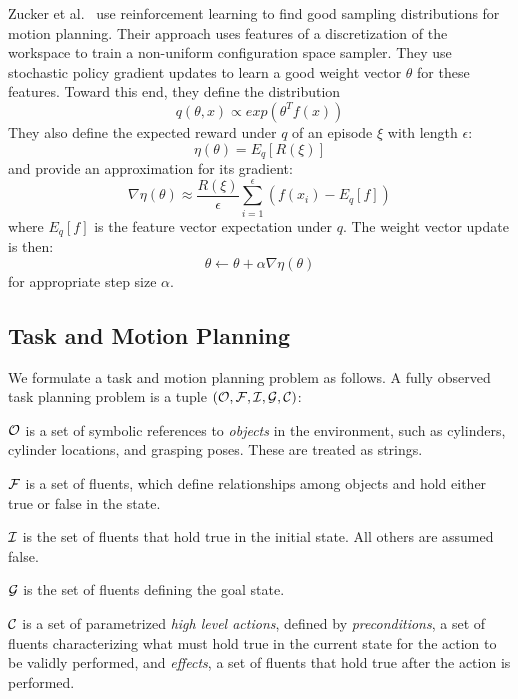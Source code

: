Zucker et al.~\cite{workspacebias} use reinforcement learning to find good sampling distributions
for motion planning. Their approach uses features of a discretization of the workspace to train
a non-uniform configuration space sampler. They use stochastic policy gradient updates to learn a good weight
vector $\theta$ for these features. Toward this end, they define the distribution
\begin{equation}
q(\theta, x) \propto exp(\theta^{T} f(x))
\end{equation}
They also define the expected reward under $q$ of an episode $\xi$ with length $\epsilon$:
\begin{equation}
\eta(\theta) = E_{q}[R(\xi)]
\end{equation}
and provide an approximation for its gradient:
\begin{equation}
\nabla \eta(\theta) \approx \frac{R(\xi)}{\epsilon} \sum_{i=1}^{\epsilon}(f(x_{i}) - E_{q}[f])
\end{equation}
where $E_{q}[f]$ is the feature vector expectation under $q$. The weight vector update is then:
\begin{equation}
\theta \leftarrow \theta + \alpha \nabla \eta(\theta)
\end{equation}
for appropriate step size $\alpha$.

\subsection{Task and Motion Planning}
We formulate a task and motion planning problem as follows. A fully observed task planning
problem is a tuple $(\mathcal{O}, \mathcal{F}, \mathcal{I}, \mathcal{G}, \mathcal{C})$:

$\mathcal{O}$ is a set of symbolic references to \emph{objects} in the environment,
such as cylinders, cylinder locations, and grasping poses. These are treated as strings.

$\mathcal{F}$ is a set of fluents, which define relationships among objects and hold either
true or false in the state.

$\mathcal{I}$ is the set of fluents that hold true in the initial state. All others are assumed false.

$\mathcal{G}$ is the set of fluents defining the goal state.

$\mathcal{C}$ is a set of parametrized \emph{high level actions}, defined by \emph{preconditions}, a set
of fluents characterizing what must hold true in the current state for the action
to be validly performed, and \emph{effects}, a set of fluents that hold true after
the action is performed.

